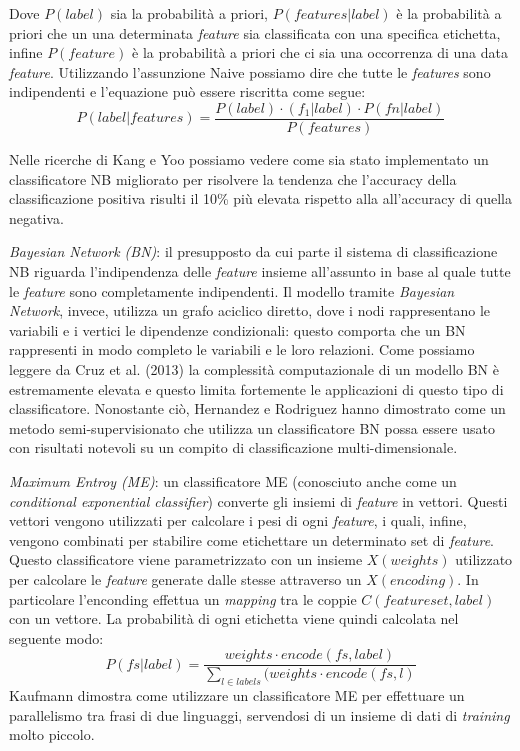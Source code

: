 \documentclass[a4paper,12pt,openright,twoside]{report}
\theoremstyle{definition}
\begin{document}
Dove $P(label)$ sia la probabilità a priori, $P(features|label)$ è
la probabilità a priori che un una determinata \emph{feature} sia
classificata con una specifica etichetta, infine $P(feature)$
è la probabilità a priori che ci sia una occorrenza di una data
\emph{feature}. Utilizzando l'assunzione Naive possiamo dire che tutte le \emph{features} sono indipendenti
e l'equazione può essere riscritta come segue:
\begin{equation}
	P(label|features)=\frac{P(label)\cdot{}(f_1|label)\cdot{}P(fn|label)}{P(features)}
	\label{Naive Bayes}
\end{equation}

Nelle ricerche di Kang e Yoo %
possiamo vedere come sia stato implementato un classificatore NB migliorato per risolvere
la tendenza che l'accuracy della classificazione positiva risulti il 10\% più elevata rispetto alla
all'accuracy di quella negativa.

\emph{Bayesian Network (BN)}: il presupposto da cui parte il sistema di classificazione NB riguarda
l'indipendenza delle \emph{feature} insieme all'assunto in base al quale tutte le \emph{feature}
sono completamente indipendenti. Il modello tramite \emph{Bayesian Network}, invece, utilizza
un grafo aciclico diretto, dove i nodi rappresentano le variabili e i vertici le dipendenze condizionali:
 questo
comporta che un BN rappresenti in modo completo le variabili e le loro relazioni.
Come possiamo leggere da Cruz et al. (2013) la complessità computazionale di un modello BN 
è estremamente
elevata e questo limita fortemente le applicazioni di questo tipo di classificatore.
Nonostante ciò, Hernandez e Rodriguez %
hanno dimostrato come un metodo semi-supervisionato che utilizza un classificatore BN possa essere
usato con risultati notevoli su un compito di classificazione multi-dimensionale.

\emph{Maximum Entroy (ME)}: un classificatore ME (conosciuto  anche come un \emph{conditional exponential classifier})
converte gli insiemi di \emph{feature} in vettori. Questi vettori vengono utilizzati per calcolare i pesi
di ogni \emph{feature}, i quali, infine, vengono combinati per stabilire come etichettare un determinato
set di \emph{feature}. Questo classificatore viene parametrizzato con un insieme $X(weights)$ utilizzato per 
calcolare le \emph{feature} generate dalle stesse attraverso un $X(encoding)$. In 
particolare l'enconding effettua un \emph{mapping} tra le coppie $C(featureset,label)$ con un vettore. La
probabilità di ogni etichetta viene quindi calcolata nel seguente modo:
\begin{equation}
	P(fs|label)=\frac{weights \cdot encode(fs,label)}{\sum\nolimits_{l\in labels}(weights \cdot encode(fs,l)}
	\label{ME}
\end{equation}
Kaufmann %
dimostra come utilizzare un classificatore ME per effettuare un parallelismo tra frasi di due linguaggi,
 servendosi
di un insieme di dati di \emph{training} molto piccolo.
\end{document}
